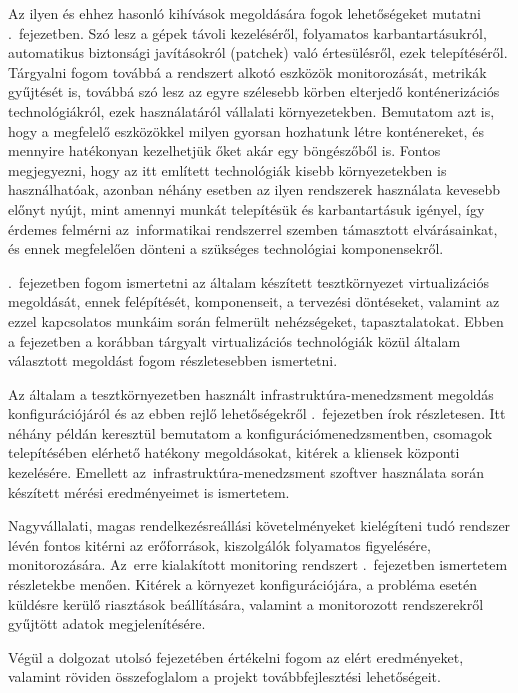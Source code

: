 Az ilyen és ehhez hasonló kihívások megoldására fogok lehetőségeket mutatni .~fejezetben. Szó lesz a gépek távoli kezeléséről, folyamatos karbantartásukról, automatikus biztonsági javításokról (patchek) való értesülésről, ezek telepítéséről. Tárgyalni fogom továbbá a rendszert alkotó eszközök monitorozását, metrikák gyűjtését is, továbbá szó lesz az egyre szélesebb körben elterjedő konténerizációs technológiákról, ezek használatáról vállalati környezetekben. Bemutatom azt is, hogy a megfelelő eszközökkel milyen gyorsan hozhatunk létre konténereket, és mennyire hatékonyan kezelhetjük őket akár egy böngészőből is.
Fontos megjegyezni, hogy az itt említett technológiák kisebb környezetekben is használhatóak, azonban néhány esetben az ilyen rendszerek használata kevesebb előnyt nyújt, mint amennyi munkát telepítésük és karbantartásuk igényel, így érdemes felmérni az~informatikai rendszerrel szemben támasztott elvárásainkat, és ennek megfelelően dönteni a szükséges technológiai komponensekről.

.~fejezetben fogom ismertetni az általam készített tesztkörnyezet virtualizációs megoldását, ennek felépítését, komponenseit, a tervezési döntéseket, valamint az ezzel kapcsolatos munkáim során felmerült nehézségeket, tapasztalatokat. Ebben a fejezetben a korábban tárgyalt virtualizációs technológiák közül általam választott megoldást fogom részletesebben ismertetni.

Az általam a tesztkörnyezetben használt infrastruktúra-menedzsment megoldás konfigurációjáról és az ebben rejlő lehetőségekről .~fejezetben írok részletesen. Itt néhány példán keresztül bemutatom a konfigurációmenedzsmentben, csomagok telepítésében elérhető hatékony megoldásokat, kitérek a kliensek központi kezelésére. Emellett az~infrastruktúra-menedzsment szoftver használata során készített mérési eredményeimet is ismertetem.

Nagyvállalati, magas rendelkezésreállási követelményeket kielégíteni tudó rendszer lévén fontos kitérni az erőforrások, kiszolgálók folyamatos figyelésére, monitorozására. Az~erre kialakított monitoring rendszert .~fejezetben ismertetem részletekbe menően. Kitérek a környezet konfigurációjára, a probléma esetén küldésre kerülő riasztások beállítására, valamint a monitorozott rendszerekről gyűjtött adatok megjelenítésére.

Végül a dolgozat utolsó fejezetében értékelni fogom az elért eredményeket, valamint röviden összefoglalom a projekt továbbfejlesztési lehetőségeit.


